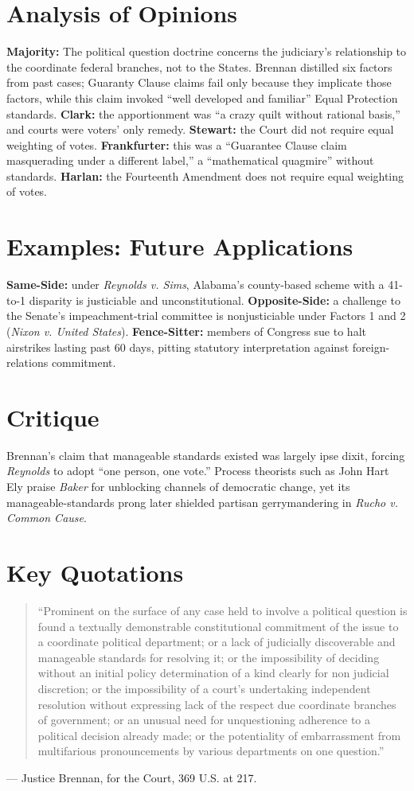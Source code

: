 \documentclass[12pt]{article}
\begin{document}
\section{Analysis of Opinions}
\textbf{Majority:} The political question doctrine concerns the judiciary's relationship to the coordinate federal branches, not to the States. Brennan distilled six factors from past cases; Guaranty Clause claims fail only because they implicate those factors, while this claim invoked ``well developed and familiar'' Equal Protection standards. \textbf{Clark:} the apportionment was ``a crazy quilt without rational basis,'' and courts were voters' only remedy. \textbf{Stewart:} the Court did not require equal weighting of votes. \textbf{Frankfurter:} this was a ``Guarantee Clause claim masquerading under a different label,'' a ``mathematical quagmire'' without standards. \textbf{Harlan:} the Fourteenth Amendment does not require equal weighting of votes.

\section{Examples: Future Applications}
\textbf{Same-Side:} under \textit{Reynolds v. Sims}, Alabama's county-based scheme with a 41-to-1 disparity is justiciable and unconstitutional. \textbf{Opposite-Side:} a challenge to the Senate's impeachment-trial committee is nonjusticiable under Factors 1 and 2 (\textit{Nixon v. United States}). \textbf{Fence-Sitter:} members of Congress sue to halt airstrikes lasting past 60 days, pitting statutory interpretation against foreign-relations commitment.

\section{Critique}
Brennan's claim that manageable standards existed was largely ipse dixit, forcing \textit{Reynolds} to adopt ``one person, one vote.'' Process theorists such as John Hart Ely praise \textit{Baker} for unblocking channels of democratic change, yet its manageable-standards prong later shielded partisan gerrymandering in \textit{Rucho v. Common Cause}.

\section{Key Quotations}
\begin{quote}
``Prominent on the surface of any case held to involve a political question is found a textually demonstrable constitutional commitment of the issue to a coordinate political department; or a lack of judicially discoverable and manageable standards for resolving it; or the impossibility of deciding without an initial policy determination of a kind clearly for non judicial discretion; or the impossibility of a court's undertaking independent resolution without expressing lack of the respect due coordinate branches of government; or an unusual need for unquestioning adherence to a political decision already made; or the potentiality of embarrassment from multifarious pronouncements by various departments on one question.''
\end{quote}
\noindent --- Justice Brennan, for the Court, 369 U.S. at 217.
\end{document}
